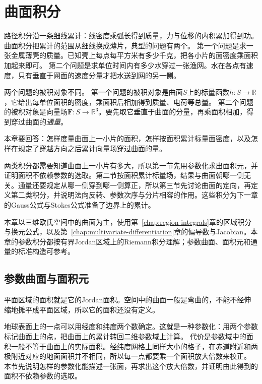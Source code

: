 \par{}
\chapter{曲面积分}
\label{sec:analysis-surface-integration}
\label{chap:surface-integrals}

路径积分沿一条细线累计：线密度乘弧长得到质量，力与位移的内积累加得到功。
曲面积分把累计的范围从细线换成薄片，典型的问题有两个。
第一个问题是求一张金属薄壳的质量。已知壳上每点每平方米有多少千克，把各小片的面密度乘面积加起来即可。
第二个问题是求单位时间内有多少水穿过一张渔网。水在各点有速度，只有垂直于网面的速度分量才把水送到网的另一侧。

两个问题的被积对象不同。
第一个问题的被积对象是曲面$S$上的标量函数$h:S\to\mathbb R$，它给出每单位面积的密度，乘面积后相加得到质量、电荷等总量。
第二个问题的被积对象是向量场$\bm F:S\to\mathbb R^3$。要先取它垂直于曲面的分量，再乘面积相加，得到穿过曲面的\emph{通量}。

本章要回答：怎样度量曲面上一小片的面积，怎样按面积累计标量面密度，以及怎样在规定了穿越方向之后累计向量场穿过曲面的量。

两类积分都需要知道曲面上一小片有多大，所以第一节先用参数化求出面积元，并证明面积不依赖参数的选取。第二节按面积累计标量场，结果与曲面朝哪一侧无关。通量还要规定从哪一侧穿到哪一侧算正，所以第三节先讨论曲面的定向，再定义第二类积分，并说明法向反转、参数次序与分片相容的作用。这些积分为下一章的Gauss公式与Stokes公式准备了边界上的累计。

本章以三维欧氏空间中的曲面为主，使用第~\ref{chap:region-integrals}章的区域积分与换元公式，以及第~\ref{chap:multivariate-differentiation}章的偏导数与Jacobian。本章的参数积分都按有界Jordan区域上的Riemann积分理解；参数曲面、面积元和通量的标准构造可参考。

\section{参数曲面与面积元}

平面区域的面积就是它的Jordan面积。空间中的曲面一般是弯曲的，不能不经伸缩地摊平成平面区域，所以它的面积还没有定义。

地球表面上的一点可以用经度和纬度两个数确定。这就是一种参数化：用两个参数标记曲面上的点，把曲面上的累计转回二维参数域上计算。
代价是参数域中的面积一般不等于曲面上的实际面积。经纬度网格上同样大小的格子，在赤道附近和两极附近对应的地面面积并不相同，所以每一点都要乘一个面积放大倍数来校正。
本节先说明怎样的参数化能描述一张面，再求出这个放大倍数，并证明由此得到的面积不依赖参数的选取。

